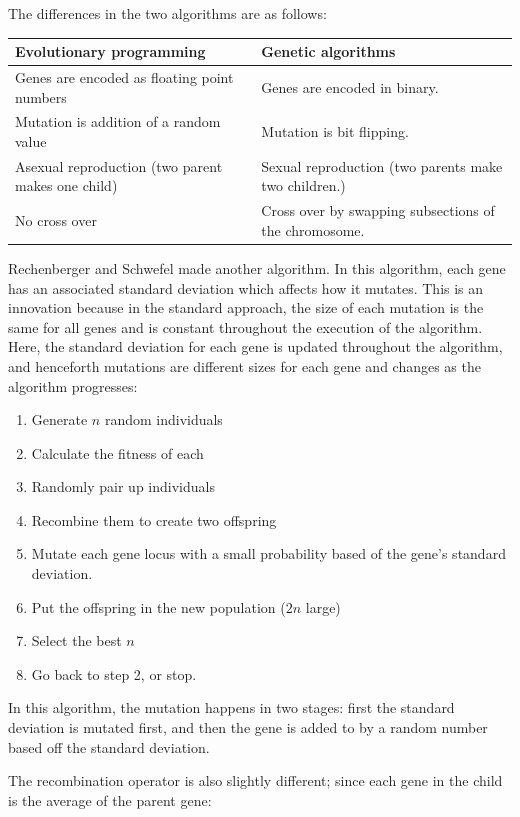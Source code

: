The differences in the two algorithms are as follows:

\begin{center}
  \begin{tabularx}{0.8\textwidth}{X|X}
    \textbf{Evolutionary programming} & \textbf{Genetic algorithms}\\ \hline
    Genes are encoded as floating point numbers & Genes are encoded in binary.\\
    Mutation is addition of a random value & Mutation is bit flipping.\\
    Asexual reproduction (two parent makes one child) & Sexual reproduction (two
    parents make two children.)\\
    No cross over & Cross over by swapping subsections of the chromosome.
  \end{tabularx}
\end{center}

Rechenberger and Schwefel made another algorithm. In this algorithm,
each gene has an associated standard deviation which affects how it
mutates. This is an innovation because in the standard approach, the
size of each mutation is the same for all genes and is constant
throughout the execution of the algorithm. Here, the standard
deviation for each gene is updated throughout the algorithm, and
henceforth mutations are different sizes for each gene and changes as
the algorithm progresses:

\begin{enumerate}
  \item Generate $n$ random individuals
  \item Calculate the fitness of each
  \item Randomly pair up individuals
  \item Recombine them to create two offspring
  \item Mutate each gene locus with a small probability based of the
  gene's standard deviation.
  \item Put the offspring in the new population ($2n$ large)
  \item Select the best $n$
  \item Go back to step 2, or stop.
\end{enumerate}

In this algorithm, the mutation happens in two stages: first the
standard deviation is mutated first, and then the gene is added to by
a random number based off the standard deviation.

The recombination operator is also slightly different; since each gene
in the child is the average of the parent gene:

